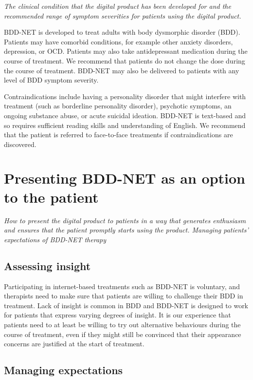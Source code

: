 \documentclass[]{book}
\theoremstyle{definition}
\theoremstyle{definition}
\theoremstyle{definition}
\theoremstyle{remark}
\begin{document}
\emph{The clinical condition that the digital product has been developed
for and the recommended range of symptom severities for patients using
the digital product.}

BDD-NET is developed to treat adults with body dysmorphic disorder
(BDD). Patients may have comorbid conditions, for example other anxiety
disorders, depression, or OCD. Patients may also take antidepressant
medication during the course of treatment. We recommend that patients do
not change the dose during the course of treatment. BDD-NET may also be
delivered to patients with any level of BDD symptom severity.

Contraindications include having a personality disorder that might
interfere with treatment (such as borderline personality disorder),
psychotic symptoms, an ongoing substance abuse, or acute suicidal
ideation. BDD-NET is text-based and so requires sufficient reading
skills and understanding of English. We recommend that the patient is
referred to face-to-face treatments if contraindications are discovered.

\hypertarget{presenting-bdd-net-as-an-option-to-the-patient}{%
\section{Presenting BDD-NET as an option to the
patient}\label{presenting-bdd-net-as-an-option-to-the-patient}}

\emph{How to present the digital product to patients in a way that
generates enthusiasm and ensures that the patient promptly starts using
the product. Managing patients' expectations of BDD-NET therapy}

\hypertarget{assessing-insight}{%
\subsection{Assessing insight}\label{assessing-insight}}

Participating in internet-based treatments such as BDD-NET is voluntary,
and therapists need to make sure that patients are willing to challenge
their BDD in treatment. Lack of insight is common in BDD and BDD-NET is
designed to work for patients that express varying degrees of insight.
It is our experience that patients need to at least be willing to try
out alternative behaviours during the course of treatment, even if they
might still be convinced that their appearance concerns are justified at
the start of treatment.

\hypertarget{managing-expectations}{%
\subsection{Managing expectations}\label{managing-expectations}}
\end{document}

